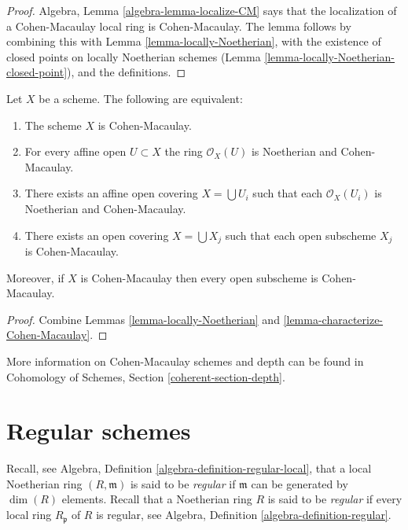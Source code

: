 \begin{proof}
Algebra, Lemma \ref{algebra-lemma-localize-CM} says that the localization of
a Cohen-Macaulay local ring is Cohen-Macaulay. The lemma follows
by combining this with Lemma \ref{lemma-locally-Noetherian},
with the existence of closed
points on locally Noetherian schemes
(Lemma \ref{lemma-locally-Noetherian-closed-point}), and
the definitions.
\end{proof}

\begin{lemma}
\label{lemma-locally-Cohen-Macaulay}
Let $X$ be a scheme. The following are equivalent:
\begin{enumerate}
\item The scheme $X$ is Cohen-Macaulay.
\item For every affine open $U \subset X$ the ring $\mathcal{O}_X(U)$
is Noetherian and Cohen-Macaulay.
\item There exists an affine open covering $X = \bigcup U_i$ such that
each $\mathcal{O}_X(U_i)$ is Noetherian and Cohen-Macaulay.
\item There exists an open covering $X = \bigcup X_j$
such that each open subscheme $X_j$ is Cohen-Macaulay.
\end{enumerate}
Moreover, if $X$ is Cohen-Macaulay then every open subscheme
is Cohen-Macaulay.
\end{lemma}

\begin{proof}
Combine Lemmas \ref{lemma-locally-Noetherian}
and \ref{lemma-characterize-Cohen-Macaulay}.
\end{proof}

\noindent
More information on Cohen-Macaulay schemes and depth can be found in
Cohomology of Schemes, Section \ref{coherent-section-depth}.








\section{Regular schemes}
\label{section-regular}

\noindent
Recall, see Algebra, Definition \ref{algebra-definition-regular-local},
that a local Noetherian ring $(R, \mathfrak m)$ is
said to be {\it regular} if $\mathfrak m$ can be generated
by $\dim(R)$ elements.
Recall that a Noetherian ring $R$ is said to be {\it regular} if
every local ring $R_{\mathfrak p}$ of $R$ is regular,
see Algebra, Definition \ref{algebra-definition-regular}.

